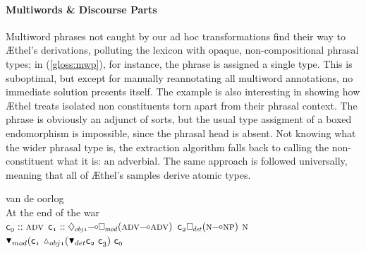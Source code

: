 \paragraph{Multiwords \& Discourse Parts}
Multiword phrases not caught by our ad hoc transformations find their way to \AE thel's derivations, polluting the lexicon with opaque, non-compositional phrasal types;
in (\ref{gloss:mwp}), for instance, the phrase  is assigned a single type.
This is suboptimal, but except for manually reannotating all multiword annotations, no immediate solution presents itself.
The example is also interesting in showing how \AE thel treats isolated non constituents torn apart from their phrasal context.
The phrase is obviously an adjunct of sorts, but the usual type assigment of a boxed endomorphism is impossible, since the phrasal head is absent.
Not knowing what the wider phrasal type is, the extraction algorithm falls back to calling the non-constituent what it is: an adverbial.
The same approach is followed universally, meaning that all of \AE thel's samples derive atomic types.

\begin{exe}
\label{gloss:mwp}
 van de oorlog\\
{At the end} of the war\\
	$\con{0}::\adv[s]$
	$\con{1}::\ddia{obj1}\li\dbox{mod}(\adv[s]\li\adv[s])$
	$\con{2}\dbox{det}(\n[s]\li\np[s])$
	$\n[s]$
\\
{\small
  $\term{
	\dboxelim{mod}(\con{1}~\ddiaintro{obj1}(
		\dboxelim{det}\con{2}~\con{3}
	)
	~\con{0}
  }
  $}
\end{exe}


